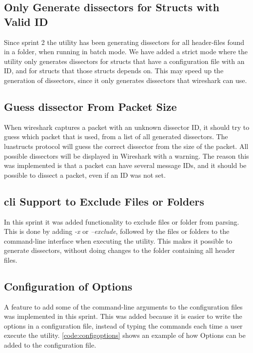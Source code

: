 \subsection{Only Generate \Glspl{dissector} for Structs with Valid ID}
Since sprint 2 the \gls{utility} has been generating \glspl{dissector} for all \gls{header}-files 
found in a folder, when running in \gls{batch mode}. We have added a strict mode where the \gls{utility} 
only generates \glspl{dissector} for \glspl{struct} that have a configuration file with an 
ID, and for \glspl{struct} that those structs depends on. This may speed up the 
generation of \glspl{dissector}, since it only generates \glspl{dissector} that \Gls{wireshark} 
can use.

\subsection{Guess \Gls{dissector} From Packet Size}
When \Gls{wireshark} captures a packet with an unknown dissector ID, it should try to 
guess which packet that is used, from a list of all generated dissectors. The 
luastructs protocol will guess the correct dissector from the size of the 
packet. All possible dissectors will be displayed in Wireshark with a warning. 
The reason this was implemented is that a packet can have several message IDs, 
and it should be possible to dissect a packet, even if an ID was not set.

\subsection{\gls{cli} Support to Exclude Files or Folders}
In this sprint it was added functionality to exclude files or folder from 
parsing. This is done by adding \emph{-x} or \emph{--exclude}, followed by the 
files or folders to the command-line interface when executing the utility. 
This makes it possible to generate dissectors, without doing changes to the 
folder containing all header files.

\subsection{Configuration of Options}
A feature to add some of the command-line arguments to the configuration files 
was implemented in this sprint. This was added because it is easier to write 
the options in a configuration file, instead of typing the commands each time 
a user execute the utility. \autoref{code:configoptions} shows an example of 
how Options can be added to the configuration file.

